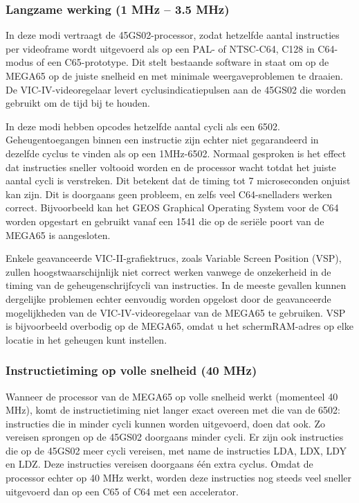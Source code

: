 \subsubsection{Langzame werking (1 MHz -- 3.5 MHz)}In deze modi vertraagt de 45GS02-processor, zodat hetzelfde aantal instructies per videoframe wordt uitgevoerd als op een PAL- of NTSC-C64, C128 in C64-modus of een C65-prototype. Dit stelt bestaande software in staat om op de MEGA65 op de juiste snelheid en met minimale weergaveproblemen te draaien. De VIC-IV-videoregelaar levert cyclusindicatiepulsen aan de 45GS02 die worden gebruikt om de tijd bij te houden.

In deze modi hebben opcodes hetzelfde aantal cycli als een 6502. Geheugentoegangen binnen een instructie zijn echter niet gegarandeerd in dezelfde cyclus te vinden als op een 1MHz-6502. Normaal gesproken is het effect dat instructies sneller voltooid worden en de processor wacht totdat het juiste aantal cycli is verstreken. Dit betekent dat de timing tot 7 microseconden onjuist kan zijn. Dit is doorgaans geen probleem, en zelfs veel C64-snelladers werken correct. Bijvoorbeeld kan het GEOS\texttrademark{} Graphical Operating System voor de C64 worden opgestart en gebruikt vanaf een 1541 die op de seriële poort van de MEGA65 is aangesloten.

Enkele geavanceerde VIC-II-grafiektrucs, zoals Variable Screen Position (VSP), zullen hoogstwaarschijnlijk niet correct werken vanwege de onzekerheid in de timing van de geheugenschrijfcycli van instructies. In de meeste gevallen kunnen dergelijke problemen echter eenvoudig worden opgelost door de geavanceerde mogelijkheden van de VIC-IV-videoregelaar van de MEGA65 te gebruiken. VSP is bijvoorbeeld overbodig op de MEGA65, omdat u het schermRAM-adres op elke locatie in het geheugen kunt instellen.

\subsubsection{Instructietiming op volle snelheid (40 MHz)}

Wanneer de processor van de MEGA65 op volle snelheid werkt (momenteel 40 MHz), komt de instructietiming niet langer exact overeen met die van de 6502: instructies die in minder cycli kunnen worden uitgevoerd, doen dat ook. Zo vereisen sprongen op de 45GS02 doorgaans minder cycli. Er zijn ook instructies die op de 45GS02 meer cycli vereisen, met name de instructies LDA, LDX, LDY en LDZ. Deze instructies vereisen doorgaans één extra cyclus. Omdat de processor echter op 40 MHz werkt, worden deze instructies nog steeds veel sneller uitgevoerd dan op een C65 of C64 met een accelerator.

